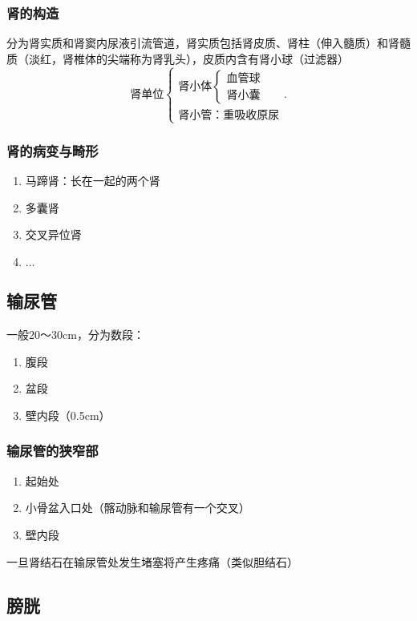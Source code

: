 \subsubsection*{肾的构造}%
\label{subsub:肾的构造}
分为肾实质和肾窦内尿液引流管道，肾实质包括肾皮质、肾柱（伸入髓质）和肾髓质（淡红，肾椎体的尖端称为肾乳头），皮质内含有肾小球（过滤器）
\[
    \text{肾单位}\begin{cases}
        \text{肾小体}\begin{cases}
            \text{血管球}\\
            \text{肾小囊}
        \end{cases}\\
        \text{肾小管：重吸收原尿}
    \end{cases}
.\]
\subsubsection*{肾的病变与畸形}%
\label{subsub:肾的病变与畸形}
\begin{enumerate}
    \item 马蹄肾：长在一起的两个肾
    \item 多囊肾
    \item 交叉异位肾
    \item $\ldots$
\end{enumerate}
\subsection{输尿管}%
\label{sub:输尿管}
一般20～30cm，分为数段：
\begin{enumerate}
    \item 腹段
    \item 盆段
    \item 壁内段（0.5cm）
\end{enumerate}
\subsubsection*{输尿管的狭窄部}%
\label{subsub:输尿管的狭窄部}
\begin{enumerate}
    \item 起始处
    \item 小骨盆入口处（髂动脉和输尿管有一个交叉）
    \item 壁内段
\end{enumerate}
一旦肾结石在输尿管处发生堵塞将产生疼痛（类似胆结石）
\subsection{膀胱}%
\label{sub:膀胱}
